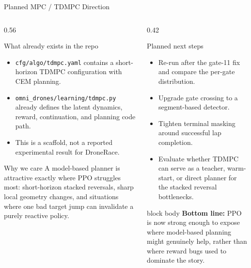 \documentclass[aspectratio=169,10pt]{beamer}
\begin{document}
\begin{frame}{Planned MPC / TDMPC Direction}
  \begin{columns}[T,totalwidth=\textwidth]
    \begin{column}{0.56\textwidth}
      \begin{block}{What already exists in the repo}
        \small
        \begin{itemize}
          \item \texttt{cfg/algo/tdmpc.yaml} contains a short-horizon TDMPC configuration with CEM planning.
          \item \texttt{omni\_drones/learning/tdmpc.py} already defines the latent dynamics, reward, continuation, and planning code path.
          \item This is a scaffold, not a reported experimental result for DroneRace.
        \end{itemize}
      \end{block}
      \begin{alertblock}{Why we care}
        \small
        A model-based planner is attractive exactly where PPO struggles most: short-horizon stacked reversals, sharp local geometry changes, and situations where one bad target jump can invalidate a purely reactive policy.
      \end{alertblock}
    \end{column}
    \begin{column}{0.42\textwidth}
      \begin{block}{Planned next steps}
        \small
        \begin{itemize}
          \item Re-run after the gate-11 fix and compare the per-gate distribution.
          \item Upgrade gate crossing to a segment-based detector.
          \item Tighten terminal masking around successful lap completion.
          \item Evaluate whether TDMPC can serve as a teacher, warm-start, or direct planner for the stacked reversal bottlenecks.
        \end{itemize}
      \end{block}
      \begin{beamercolorbox}[wd=\linewidth,sep=0.5ex,rounded=true]{block body}
        \small\textbf{Bottom line:} PPO is now strong enough to expose where model-based planning might genuinely help, rather than where reward bugs used to dominate the story.
      \end{beamercolorbox}
    \end{column}
  \end{columns}
\end{frame}
\end{document}
